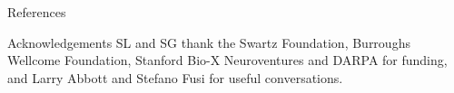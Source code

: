 \documentclass[final,hyperref={pdfpagelabels=false,bookmarks=false}]{beamer}
\begin{document}
\begin{frame}{}
\begin{columns}[t]
\begin{column}{0.32\linewidth}

\begin{block}{References}
%
 {\small
 
 
 }
%
\end{block}


\begin{block}{Acknowledgements}
%
 SL and SG thank the Swartz Foundation, Burroughs Wellcome Foundation, Stanford Bio-X Neuroventures and DARPA for funding, and Larry Abbott and Stefano Fusi for useful conversations.

%
\end{block}


\end{column}





\end{columns}

\end{frame}
\end{document}
